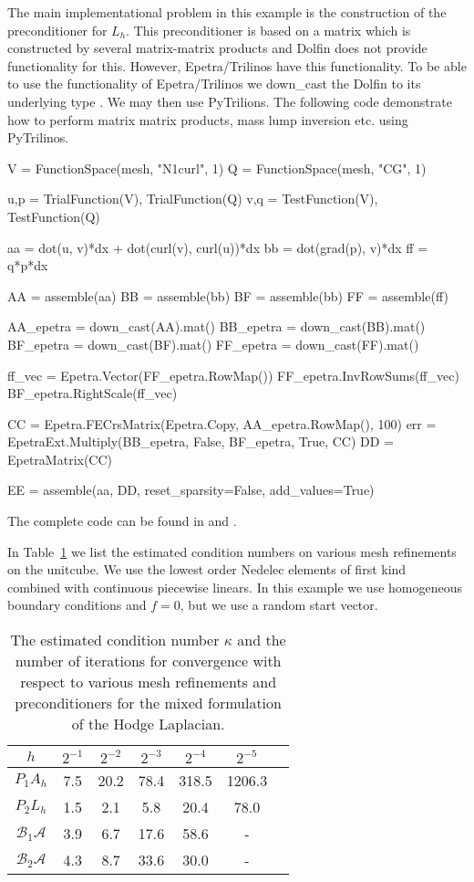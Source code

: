 The main implementational problem in this example is the construction of the preconditioner
for $L_h$. This preconditioner is based on a matrix which is constructed by 
several matrix-matrix products and Dolfin does not provide functionality for
this. However, Epetra/Trilinos have this functionality. To be able 
to use the functionality of Epetra/Trilinos we down\_cast the Dolfin 
to its underlying type . We may then use PyTrilions. 
The following code demonstrate how to perform matrix matrix products, mass lump inversion  etc. using 
PyTrilinos. 
\begin{python}
V = FunctionSpace(mesh, "N1curl", 1)
Q = FunctionSpace(mesh, "CG", 1)

u,p = TrialFunction(V), TrialFunction(Q)
v,q = TestFunction(V), TestFunction(Q)

aa = dot(u, v)*dx + dot(curl(v), curl(u))*dx   
bb = dot(grad(p), v)*dx  
ff = q*p*dx  

AA = assemble(aa) 
BB = assemble(bb) 
BF = assemble(bb) 
FF = assemble(ff)

AA_epetra = down_cast(AA).mat()
BB_epetra = down_cast(BB).mat()
BF_epetra = down_cast(BF).mat()
FF_epetra = down_cast(FF).mat()

ff_vec = Epetra.Vector(FF_epetra.RowMap())
FF_epetra.InvRowSums(ff_vec)
BF_epetra.RightScale(ff_vec)

CC = Epetra.FECrsMatrix(Epetra.Copy, AA_epetra.RowMap(), 100)
err = EpetraExt.Multiply(BB_epetra, False, BF_epetra, True, CC) 
DD = EpetraMatrix(CC)

EE = assemble(aa, DD, reset_sparsity=False, add_values=True)
\end{python}
The complete code can be found in  and . 

In Table~\ref{table:hodge} we list the estimated condition numbers on various mesh refinements
on the unitcube. We use the  lowest order Nedelec elements of first kind~\cite{Nedelec1980a} combined with continuous piecewise linears.
In this example we use homogeneous boundary conditions and $f=0$, but we use a random start vector. 
\begin{table}
\begin{center}
\begin{tabular}{|c||c|c|c|c|c|c|}
\hline
$h$ & $2^{-1}$ & $2^{-2}$ & $2^{-3}$ & $2^{-4}$  & $2^{-5}$ \\ \hline 
$ P_1 A_h$ & 7.5 & 20.2 & 78.4 & 318.5 & 1206.3 \\ \hline
$ P_2 L_h$ & 1.5 & 2.1  & 5.8  & 20.4 & 78.0 \\ \hline
$\mathcal{B}_1 \mathcal{A}$ & 3.9 & 6.7 & 17.6 & 58.6 & - \\ \hline
$\mathcal{B}_2 \mathcal{A}$ & 4.3 & 8.7 & 33.6 & 30.0 & - \\ \hline
\end{tabular}
\caption{The estimated condition number $\kappa$ and the number of iterations for 
  convergence with respect to various mesh refinements and preconditioners for the mixed formulation of the Hodge Laplacian.}  \label{table:hodge}
\end{center}
\end{table}



